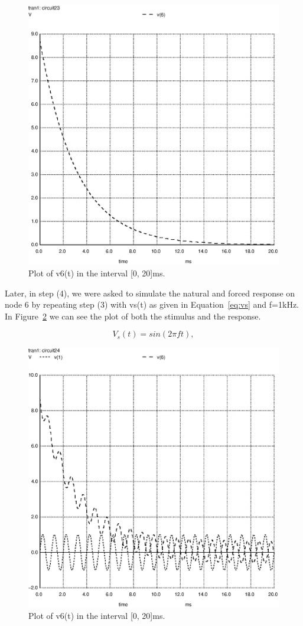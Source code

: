 \begin{figure}[h] \centering
\includegraphics[width=0.8\linewidth]{naturalsolution.eps}
\caption{Plot of v6(t) in the interval [0, 20]ms.}
\label{fig:plotS(3)}
\end{figure}

Later, in step (4), we were asked to simulate the natural and forced response on node 6 by repeating step (3) with vs(t) as given in Equation~\ref{eq:vs} and f=1kHz. In Figure~\ref{fig:plotS(4)} we can see the plot of both the stimulus and the response.

\begin{equation}
  V_{s}(t) = sin(2 \pi f t),
  \label{eq:vs}
\end{equation}

\vspace{8.0cm}

\begin{figure}[h] \centering
\includegraphics[width=0.8\linewidth]{forcedsolution.eps}
\caption{Plot of v6(t) in the interval [0, 20]ms.}
\label{fig:plotS(4)}
\end{figure}


